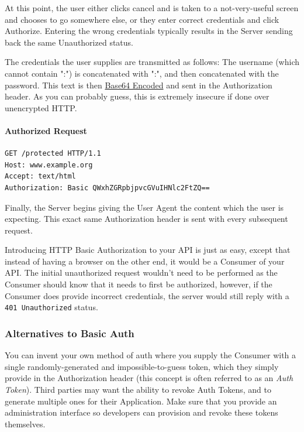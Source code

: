 \documentclass{book}
\begin{document}
At this point, the user either clicks cancel and is taken to a not-very-useful screen and chooses to go somewhere else, or they enter correct credentials and click Authorize. Entering the wrong credentials typically results in the Server sending back the same Unauthorized status.

The credentials the user supplies are transmitted as follows: The username (which cannot contain ":") is concatenated with ":", and then concatenated with the password. This text is then \href{https://en.wikipedia.org/wiki/Base64}{Base64 Encoded} and sent in the Authorization header. As you can probably guess, this is extremely insecure if done over unencrypted HTTP.

\paragraph{\textbf{Authorized Request}}

\begin{verbatim}
GET /protected HTTP/1.1
Host: www.example.org
Accept: text/html
Authorization: Basic QWxhZGRpbjpvcGVuIHNlc2FtZQ==
\end{verbatim}

Finally, the Server begins giving the User Agent the content which the user is expecting. This exact same Authorization header is sent with every subsequent request.

Introducing HTTP Basic Authorization to your API is just as easy, except that instead of having a browser on the other end, it would be a Consumer of your API. The initial unauthorized request wouldn't need to be performed as the Consumer should know that it needs to first be authorized, however, if the Consumer does provide incorrect credentials, the server would still reply with a \texttt{401 Unauthorized} status.

\subsubsection{Alternatives to Basic Auth}

You can invent your own method of auth where you supply the Consumer with a single randomly-generated and impossible-to-guess token, which they simply provide in the Authorization header (this concept is often referred to as an \emph{Auth Token}). Third parties may want the ability to revoke Auth Tokens, and to generate multiple ones for their Application. Make sure that you provide an administration interface so developers can provision and revoke these tokens themselves.
\end{document}
